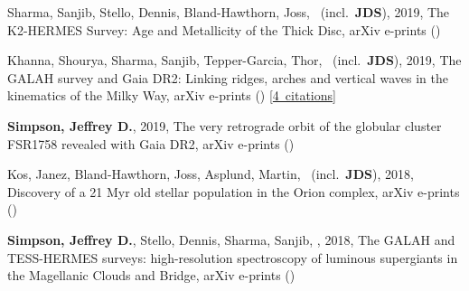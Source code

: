 \item[{\color{numcolor}\scriptsize5}] Sharma, Sanjib, Stello, Dennis, Bland-Hawthorn, Joss, \etal\ (incl.\ \textbf{JDS}), 2019, The K2-HERMES Survey: Age and Metallicity of the Thick Disc, arXiv e-prints ()

\item[{\color{numcolor}\scriptsize4}] Khanna, Shourya, Sharma, Sanjib, Tepper-Garcia, Thor, \etal\ (incl.\ \textbf{JDS}), 2019, The GALAH survey and Gaia DR2: Linking ridges, arches and vertical waves in the kinematics of the Milky Way, arXiv e-prints () [\href{https://ui.adsabs.harvard.edu/#abs/2019arXiv190210113K}{4~citations}]

\item[{\color{numcolor}\scriptsize3}] \textbf{Simpson, Jeffrey D.}, 2019, The very retrograde orbit of the globular cluster FSR1758 revealed with Gaia DR2, arXiv e-prints ()

\item[{\color{numcolor}\scriptsize2}] Kos, Janez, Bland-Hawthorn, Joss, Asplund, Martin, \etal\ (incl.\ \textbf{JDS}), 2018, Discovery of a 21 Myr old stellar population in the Orion complex, arXiv e-prints ()

\item[{\color{numcolor}\scriptsize1}] \textbf{Simpson, Jeffrey D.}, Stello, Dennis, Sharma, Sanjib, \etal, 2018, The GALAH and TESS-HERMES surveys: high-resolution spectroscopy of luminous supergiants in the Magellanic Clouds and Bridge, arXiv e-prints ()